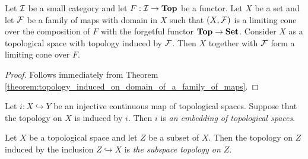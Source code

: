 \begin{corollary}\label{corollary:limits_in_category_of_topological_spaces}
	Let ${\mathcal I}$ be a small category and let $F:{\mathcal I} \rightarrow \mathbf{Top}$ be a functor. Let $X$ be a set and let ${\mathcal F}$ be a family of maps with domain in $X$ such that $(X,{\mathcal F})$ is a limiting cone over the composition of $F$ with the forgetful functor $\mathbf{Top} \rightarrow \mathbf{Set}$. Consider $X$ as a topological space with topology induced by ${\mathcal F}$. Then $X$ together with ${\mathcal F}$ form a limiting cone over $F$.
\end{corollary}
\begin{proof}
	Follows immediately from Theorem \ref{theorem:topology_induced_on_domain_of_a_family_of_maps}.
\end{proof}

\begin{definition}
	Let $i:X\hookrightarrow Y$ be an injective continuous map of topological spaces. Suppose that the topology on $X$ is induced by $i$. Then $i$ is \textit{an embedding of topological spaces}.
\end{definition}

\begin{definition}
	Let $X$ be a topological space and let $Z$ be a subset of $X$. Then the topology on $Z$ induced by the inclusion $Z \hookrightarrow X$ is \textit{the subspace topology on $Z$}.
\end{definition}

